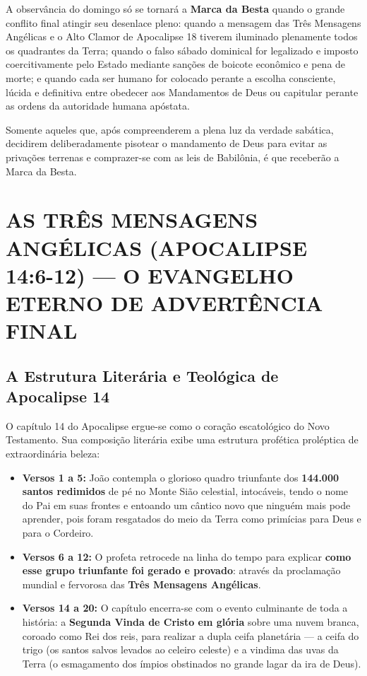A observância do domingo só se tornará a \textbf{Marca da Besta} quando o grande conflito final atingir seu desenlace pleno: quando a mensagem das Três Mensagens Angélicas e o Alto Clamor de Apocalipse 18 tiverem iluminado plenamente todos os quadrantes da Terra; quando o falso sábado dominical for legalizado e imposto coercitivamente pelo Estado mediante sanções de boicote econômico e pena de morte; e quando cada ser humano for colocado perante a escolha consciente, lúcida e definitiva entre obedecer aos Mandamentos de Deus ou capitular perante as ordens da autoridade humana apóstata.

Somente aqueles que, após compreenderem a plena luz da verdade sabática, decidirem deliberadamente pisotear o mandamento de Deus para evitar as privações terrenas e comprazer-se com as leis de Babilônia, é que receberão a Marca da Besta.



\section{AS TRÊS MENSAGENS ANGÉLICAS (APOCALIPSE 14:6-12) — O EVANGELHO ETERNO DE ADVERTÊNCIA FINAL}



\subsection{A Estrutura Literária e Teológica de Apocalipse 14}


O capítulo 14 do Apocalipse ergue-se como o coração escatológico do Novo Testamento. Sua composição literária exibe uma estrutura profética proléptica de extraordinária beleza:

\begin{itemize}
  \item \textbf{Versos 1 a 5:} João contempla o glorioso quadro triunfante dos \textbf{144.000 santos redimidos} de pé no Monte Sião celestial, intocáveis, tendo o nome do Pai em suas frontes e entoando um cântico novo que ninguém mais pode aprender, pois foram resgatados do meio da Terra como primícias para Deus e para o Cordeiro.
  \item \textbf{Versos 6 a 12:} O profeta retrocede na linha do tempo para explicar \textbf{como esse grupo triunfante foi gerado e provado}: através da proclamação mundial e fervorosa das \textbf{Três Mensagens Angélicas}.
  \item \textbf{Versos 14 a 20:} O capítulo encerra-se com o evento culminante de toda a história: a \textbf{Segunda Vinda de Cristo em glória} sobre uma nuvem branca, coroado como Rei dos reis, para realizar a dupla ceifa planetária — a ceifa do trigo (os santos salvos levados ao celeiro celeste) e a vindima das uvas da Terra (o esmagamento dos ímpios obstinados no grande lagar da ira de Deus).
\end{itemize}


